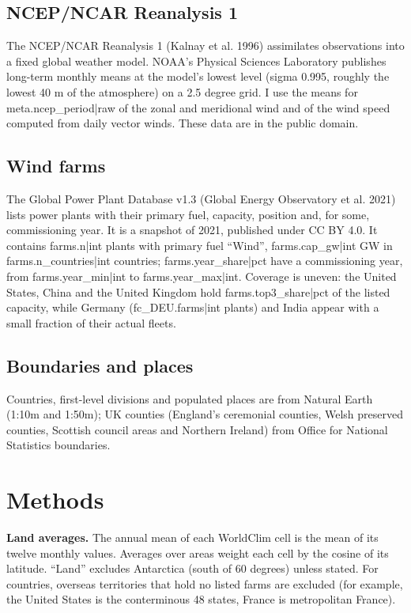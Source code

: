 \documentclass[11pt,a4paper]{article}
\begin{document}
\subsection{NCEP/NCAR Reanalysis 1}
The NCEP/NCAR Reanalysis 1 (Kalnay et al. 1996) assimilates observations into a fixed global weather model. NOAA's Physical Sciences Laboratory publishes long-term monthly means at the model's lowest level (sigma 0.995, roughly the lowest 40 m of the atmosphere) on a 2.5 degree grid. I use the means for {{meta.ncep_period|raw}} of the zonal and meridional wind and of the wind speed computed from daily vector winds. These data are in the public domain.

\subsection{Wind farms}
The Global Power Plant Database v1.3 (Global Energy Observatory et al. 2021) lists power plants with their primary fuel, capacity, position and, for some, commissioning year. It is a snapshot of 2021, published under CC BY 4.0. It contains {{farms.n|int}} plants with primary fuel ``Wind'', {{farms.cap_gw|int}} GW in {{farms.n_countries|int}} countries; {{farms.year_share|pct}} have a commissioning year, from {{farms.year_min|int}} to {{farms.year_max|int}}. Coverage is uneven: the United States, China and the United Kingdom hold {{farms.top3_share|pct}} of the listed capacity, while Germany ({{fc_DEU.farms|int}} plants) and India appear with a small fraction of their actual fleets.

\subsection{Boundaries and places}
Countries, first-level divisions and populated places are from Natural Earth (1:10m and 1:50m); UK counties (England's ceremonial counties, Welsh preserved counties, Scottish council areas and Northern Ireland) from Office for National Statistics boundaries.

\section{Methods}

\textbf{Land averages.} The annual mean of each WorldClim cell is the mean of its twelve monthly values. Averages over areas weight each cell by the cosine of its latitude. ``Land'' excludes Antarctica (south of 60 degrees) unless stated. For countries, overseas territories that hold no listed farms are excluded (for example, the United States is the conterminous 48 states, France is metropolitan France).
\end{document}
